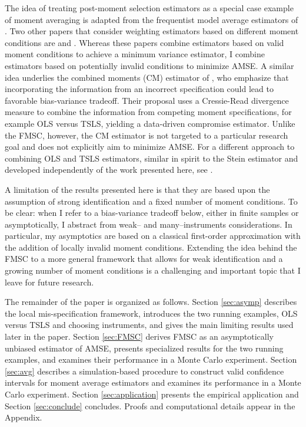 The idea of treating post-moment selection estimators as a special case example of moment averaging is adapted from the frequentist model average estimators of \cite{HjortClaeskens}.
Two other papers that consider weighting estimators based on different moment conditions are \cite{Xiao} and \cite{ChenChavezLinton}.
Whereas these papers combine estimators based on valid moment conditions to achieve a minimum variance estimator, I combine estimators based on potentially invalid conditions to minimize AMSE. 
A similar idea underlies the combined moments (CM) estimator of \cite{Judge2007}, who emphasize that incorporating the information from an incorrect specification could lead to favorable bias-variance tradeoff. 
Their proposal uses a Cressie-Read divergence measure to combine the information from competing moment specifications, for example OLS versus TSLS, yielding a data-driven compromise estimator. Unlike the FMSC, however, the CM estimator is not targeted to a particular research goal and does not explicitly aim to minimize AMSE.
For a different approach to combining OLS and TSLS estimators, similar in spirit to the Stein estimator and developed independently of the work presented here, see \cite{Hansen2014}.

A limitation of the results presented here is that they are based upon the assumption of strong identification and a fixed number of moment conditions.
To be clear: when I refer to a bias-variance tradeoff below, either in finite samples or asymptotically, I abstract from weak-- and many--instruments considerations.
In particular, my asymptotics are based on a classical first-order approximation with the addition of locally invalid moment conditions.
Extending the idea behind the FMSC to a more general framework that allows for weak identification and a growing number of moment conditions is a challenging and important topic that I leave for future research.

The remainder of the paper is organized as follows.
Section \ref{sec:asymp} describes the local mis-specification framework, introduces the two running examples, OLS versus TSLS and choosing instruments, and gives the main limiting results used later in the paper. 
Section \ref{sec:FMSC} derives FMSC as an asymptotically unbiased estimator of AMSE, presents specialized results for the two running examples, and examines their performance in a Monte Carlo experiment. 
Section \ref{sec:avg} describes a simulation-based procedure to construct valid confidence intervals for moment average estimators and examines its performance in a Monte Carlo experiment. Section \ref{sec:application} presents the empirical application and Section \ref{sec:conclude} concludes.
Proofs and computational details appear in the Appendix.